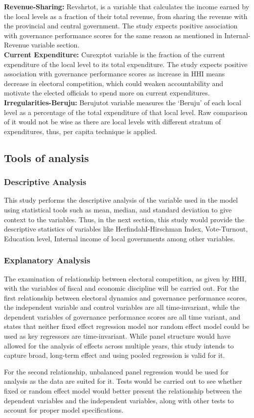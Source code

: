 \textbf{Revenue-Sharing:} Revshrtot, is a variable that calculates the income earned by the local levels as a fraction of their total revenue, from sharing the revenue with the provincial and central government. The study expects positive association with governance performance scores for the same reason as mentioned in Internal-Revenue variable section.\\
\textbf{Current Expenditure:} Curexptot variable is the fraction of the current expenditure of the local level to its total expenditure. The study expects positive association with governance performance scores as increase in HHI means decrease in electoral competition, which could weaken accountability and motivate the elected officials to spend more on current expenditures.\\
\textbf{Irregularities-Beruju:} Berujutot variable measures the `Beruju' of each local level as a percentage of the total expenditure of that local level. Raw comparison of it would not be wise as there are local levels with different stratum of expenditures, thus, per capita technique is applied. 
\vspace{-3mm}
\subsection{Tools of analysis}
\subsubsection{Descriptive Analysis}
This study performs the descriptive analysis of the variable used in the model using statistical tools such as mean, median, and standard deviation to give context to the variables. Thus, in the next section, this study would provide the descriptive statistics of variables like HerfindahI-Hirschman Index, Vote-Turnout, Education level, Internal income of local governments among other variables.
\subsubsection{Explanatory Analysis}
The examination of relationship between electoral competition, as given by HHI, with the variables of fiscal and economic discipline will be carried out. For the first relationship between electoral dynamics and governance performance scores,  the independent variable and control variables are all time-invariant, while the dependent variables of governance performance scores are all time variant,  and  states that neither fixed effect regression model nor random effect model could be used as key regressors are time-invariant. While panel structure would have allowed for the analysis of effects across multiple years, this study intends to capture broad, long-term effect and using pooled regression is valid for it. \par
For the second relationship, unbalanced panel regression would be used for analysis as the data are suited for it. Tests would be carried out to see whether fixed or random effect model would better present the relationship between the dependent variables and the independent variables, along with other tests to account for proper model specifications. 
\vspace{-4mm}
